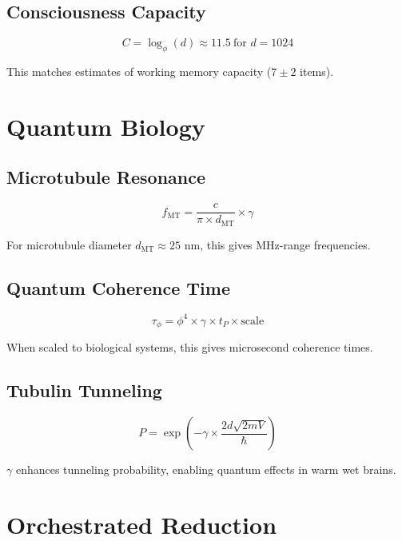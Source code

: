 \documentclass[12pt,a4paper]{article}
\begin{document}
\subsection{Consciousness Capacity}

\begin{equation}
C = \log_\phi(d) \approx 11.5~\text{for } d = 1024
\end{equation}

This matches estimates of working memory capacity ($7 \pm 2$ items).

\section{Quantum Biology}

\subsection{Microtubule Resonance}

\begin{equation}
f_{\text{MT}} = \frac{c}{\pi \times d_{\text{MT}}} \times \gamma
\end{equation}

For microtubule diameter $d_{\text{MT}} \approx 25$ nm, this gives MHz-range frequencies.

\subsection{Quantum Coherence Time}

\begin{equation}
\tau_\phi = \phi^4 \times \gamma \times t_P \times \text{scale}
\end{equation}

When scaled to biological systems, this gives microsecond coherence times.

\subsection{Tubulin Tunneling}

\begin{equation}
P = \exp\left(-\gamma \times \frac{2d\sqrt{2mV}}{\hbar}\right)
\end{equation}

$\gamma$ enhances tunneling probability, enabling quantum effects in warm wet brains.

\section{Orchestrated Reduction}
\end{document}
